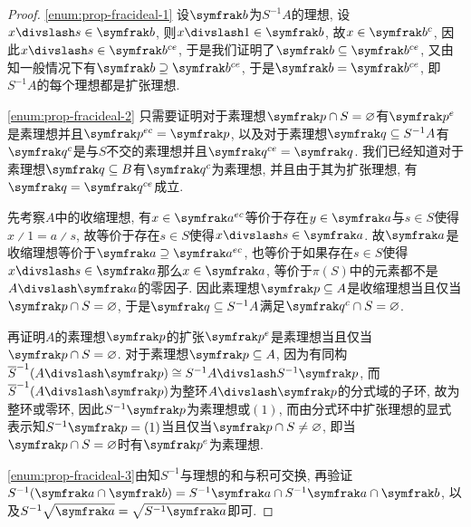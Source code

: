 \begin{proof}
  \ref{enum:prop-fracideal-1} 设$\ideal{b}$为$S^{-1}A$的理想, 设$x{\divslash}s\in \ideal{b}$, 则$x{\divslash}1\in\ideal{b}$, 故$x\in\ideal{b}^c$, 因此$x{\divslash}s\in\ideal{b}^{ce}$, 于是我们证明了$\ideal{b}\subseteq\ideal{b}^{ce}$, 又由知一般情况下有$\ideal{b}\supseteq\ideal{b}^{ce}$, 于是$\ideal{b}=\ideal{b}^{ce}$, 即$S^{-1}A$的每个理想都是扩张理想.

  \ref{enum:prop-fracideal-2} 只需要证明对于素理想$\ideal{p}\cap S=\varnothing$有$\ideal{p}^e$是素理想并且$\ideal{p}^{ec}=\ideal{p}$, 以及对于素理想$\ideal{q}\subseteq S^{-1}A$有$\ideal{q}^c$是与$S$不交的素理想并且$\ideal{q}^{ce}=\ideal{q}$. 我们已经知道对于素理想$\ideal{q}\subseteq B$有$\ideal{q}^c$为素理想, 并且由于其为扩张理想, 有$\ideal{q}=\ideal{q}^{ce}$成立.

  先考察$A$中的收缩理想, 有$x\in\ideal{a}^{ec}$等价于存在$y\in\ideal{a}$与$s\in S$使得$x{\divslash}1=a{\divslash}s$, 故等价于存在$s\in S$使得$x{\divslash}s\in\ideal{a}$. 故$\ideal{a}$是收缩理想等价于$\ideal{a}\supseteq\ideal{a}^{ec}$, 也等价于如果存在$s\in S$使得$x{\divslash}s\in\ideal{a}$那么$x\in\ideal{a}$, 等价于$\pi(S)$中的元素都不是$A{\divslash}\ideal{a}$的零因子. 因此素理想$\ideal{p}\subseteq A$是收缩理想当且仅当$\ideal{p}\cap S=\varnothing$, 于是$\ideal{q}\subseteq S^{-1}A$满足$\ideal{q}^c\cap S=\varnothing$.

  再证明$A$的素理想$\ideal{p}$的扩张$\ideal{p}^e$是素理想当且仅当$\ideal{p}\cap S=\varnothing$. 对于素理想$\ideal{p}\subseteq A$, 因为有同构$\overline{S}^{-1}(A{\divslash}\ideal{p})\cong S^{-1}A{\divslash}S^{-1}\ideal{p}$, 而$\overline{S}^{-1}(A{\divslash}\ideal{p})$为整环$A{\divslash}\ideal{p}$的分式域的子环, 故为整环或零环, 因此$S^{-1}\ideal{p}$为素理想或$(1)$, 而由分式环中扩张理想的显式表示知$S^{-1}\ideal{p}=(1)$当且仅当$\ideal{p}\cap S\neq\varnothing$, 即当$\ideal{p}\cap S=\varnothing$时有$\ideal{p}^e$为素理想.

  \ref{enum:prop-fracideal-3}由知$S^{-1}$与理想的和与积可交换, 再验证$S^{-1}(\ideal{a}\cap\ideal{b})=S^{-1}\ideal{a}\cap S^{-1}\ideal{a}\cap\ideal{b}$, 以及$S^{-1}\sqrt{\ideal{a}}=\sqrt{S^{-1}\ideal{a}}$即可.
\end{proof}

